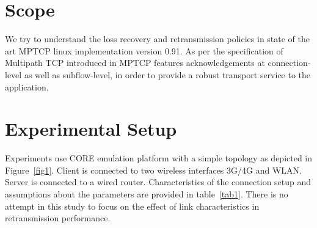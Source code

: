 \documentclass[12pt,draftcls,onecolumn]{IEEEtran}
\begin{document}
\section{Scope}\label{scope}

We try to understand the loss recovery and retransmission policies in state of the art MPTCP linux implementation version 0.91. As per the specification of Multipath TCP introduced in 
MPTCP features acknowledgements at connection-level as well as subflow-level, in order to provide a robust transport service to the application.


\section{Experimental Setup}\label{exsetup}

Experiments use CORE emulation platform with a simple topology as depicted in Figure~\ref{fig1}.
Client is connected to two wireless interfaces 3G/4G and WLAN. Server is connected to a wired router.
Characteristics of the connection setup and assumptions about the parameters are provided in table~\ref{tab1}.
There is no attempt in this study to focus on the effect of link characteristics in retransmission performance.
 
\end{document}
